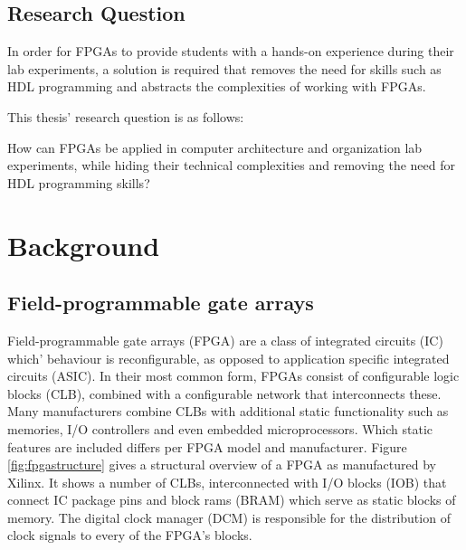 \documentclass[openright]{template/uva-bachelor-thesis}
\begin{document}


\section{Research Question}

In order for FPGAs to provide students with a hands-on experience during their lab experiments, a solution is required 
that removes the need for skills such as HDL programming and abstracts the complexities of working with FPGAs.

This thesis' research question is as follows: 

\begin{displayquote}
How can FPGAs be applied in computer architecture and organization lab experiments, while hiding their technical complexities and removing the need for HDL programming skills?
\end{displayquote}







\chapter{Background}


\section{Field-programmable gate arrays}
Field-programmable gate arrays (FPGA) are a class of integrated circuits (IC) which' behaviour is reconfigurable, as opposed to application specific integrated circuits (ASIC). In their most common form, FPGAs consist of configurable logic blocks (CLB), combined with a configurable network that interconnects these. Many manufacturers combine CLBs with additional static functionality such as memories, I/O controllers and even embedded microprocessors. Which static features are included differs per FPGA model and manufacturer. Figure \ref{fig:fpgastructure} gives a structural overview of a FPGA as manufactured by Xilinx. It shows a number of CLBs, interconnected with I/O blocks (IOB) that connect IC package pins and block rams (BRAM) which serve as static blocks of memory. The digital clock manager (DCM) is responsible for the distribution of clock signals to every of the FPGA's blocks. 
\end{document}
